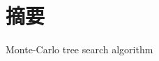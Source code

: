 
\section*{摘要}
Monte-Carlo tree search algorithm\cite{DBLP:conf/ecml/KocsisS06}\cite{DBLP:conf/aiide/ChaslotBSS08}
